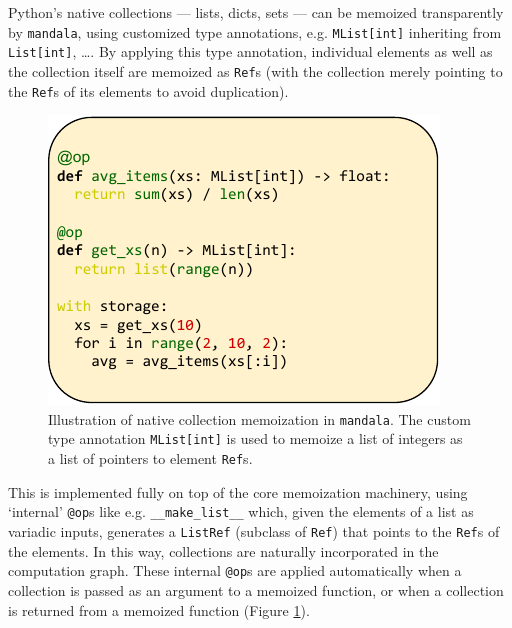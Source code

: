 Python's native collections --- lists, dicts, sets --- can be memoized
transparently by \texttt{mandala}, using customized type annotations, e.g.
\texttt{MList[int]} inheriting from \texttt{List[int]}, \ldots. By applying this
type annotation, individual elements as well as the collection itself are
memoized as \texttt{Ref}s (with the collection merely pointing to the
\texttt{Ref}s of its elements to avoid duplication).

\begin{figure}
    \centering
    \includegraphics[width=\linewidth]{img/list.pdf}
    \caption{Illustration of native collection memoization in \texttt{mandala}.
    The custom type annotation \texttt{MList[int]} is used to memoize a list of
    integers as a list of pointers to element \texttt{Ref}s.}
    \label{fig:list}
\end{figure}

This is implemented fully on top of the core memoization machinery, using
`internal' \texttt{@op}s like e.g. \verb|__make_list__| which, given the
elements of a list as variadic inputs, generates a \texttt{ListRef} (subclass of
\texttt{Ref}) that points to the \texttt{Ref}s of the elements. In this way,
collections are naturally incorporated in the computation graph. These internal
\texttt{@op}s are applied automatically when a collection is passed as an
argument to a memoized function, or when a collection is returned from a
memoized function (Figure \ref{fig:list}).


